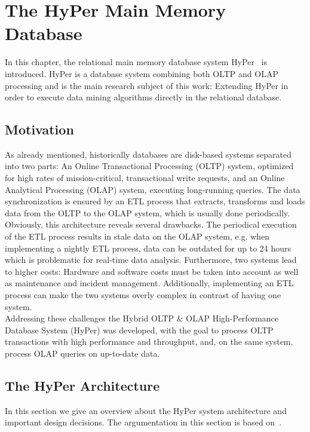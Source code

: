 \chapter{The HyPer Main Memory Database}\label{chapter:hyper}
In this chapter, the relational main memory database system HyPer~\parencite{5767867} is introduced. HyPer is a database system combining both OLTP and OLAP processing and is the main research subject of this work: Extending HyPer in order to execute data mining algorithms directly in the relational database.

\section{Motivation}

As already mentioned, historically databases are disk-based systems separated into two parts: An Online Transactional Processing (OLTP) system, optimized for high rates of mission-critical, transactional write requests, and an Online Analytical Processing (OLAP) system, executing long-running queries. The data synchronization is ensured by an ETL process that extracts, transforms and loads data from the OLTP to the OLAP system, which is usually done periodically. 
\\
Obviously, this architecture reveals several drawbacks. The periodical execution of the ETL process results in stale data on the OLAP system, e.g. when implementing a nightly ETL process, data can be outdated for up to 24 hours which is problematic for real-time data analysis. Furthermore, two systems lead to higher costs: Hardware and software costs must be taken into account as well as maintenance and incident management. Additionally, implementing an ETL process can make the two systems overly complex in contrast of having one system.
\\
Addressing these challenges the Hybrid OLTP \& OLAP High-Performance Database System (HyPer) was developed, with the goal to process OLTP transactions with high performance and throughput, and, on the same system, process OLAP queries on up-to-date data. 

\section{The HyPer Architecture}
In this section we give an overview about the HyPer system architecture and important design decisions. The argumentation in this section is based on~\parencite{5767867}. 

